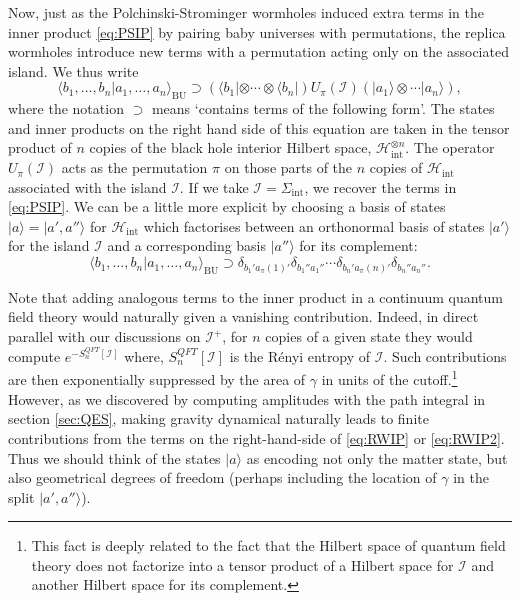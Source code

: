 \documentclass[letterpaper,12pt]{article}
\newcommand*{\hilb}{\mathcal{H}}	%
\newcommand*{\scri}{\mathscr{I}} %
\newcommand*{\island}{\mathcal{I}}
\begin{document}
Now, just as the Polchinski-Strominger wormholes induced extra terms in the inner product \eqref{eq:PSIP} by pairing baby universes with permutations, the replica wormholes introduce new terms with a permutation acting only on the associated island.  We thus write
\begin{equation}\label{eq:RWIP}
	\langle b_1,\ldots,b_n|a_1,\ldots,a_n \rangle_{\mathrm{BU}} \supset  (\langle b_1|\otimes \cdots \otimes \langle b_n|) U_\pi(\island) (|a_1\rangle\otimes \cdots |a_n \rangle),
\end{equation}
where the notation $\supset$ means `contains terms of the following form'.
The states and inner products on the right hand side of this equation are taken in the tensor product of $n$ copies of the black hole interior Hilbert space, $\hilb_\mathrm{int}^{\otimes n}$. The operator $U_\pi(\island)$ acts as the permutation $\pi$ on those parts of the $n$ copies of $\hilb_\mathrm{int}$ associated with the island $\island$. If we take $\island=\Sigma_\mathrm{int}$, we recover the terms in \eqref{eq:PSIP}. We can be a little more explicit by choosing a basis of states $|a\rangle = |a',a''\rangle$ for $\hilb_\mathrm{int}$ which factorises between an orthonormal basis of states $|a'\rangle$ for the island $\island$ and a corresponding basis  $|a''\rangle$ for its complement:
\begin{equation}\label{eq:RWIP2}
	\langle b_1,\ldots,b_n|a_1,\ldots,a_n \rangle_{\mathrm{BU}} \supset \delta_{b_1'a_\pi(1)'}\delta_{b_1''a_1''}\cdots  \delta_{b_n'a_\pi(n)'}\delta_{b_n''a_n''}.
\end{equation}

Note that adding analogous terms to the inner product in a continuum quantum field theory would naturally given a vanishing contribution.  Indeed, in direct parallel with our discussions on $\scri^+$, for $n$ copies of a given state they would compute $e^{-S_n^{QFT}[\island]}$ where,
$S_n^{QFT}[\island]$ is the R\'enyi entropy of $\island$.  Such contributions are then exponentially suppressed by the area of $\gamma$ in units of the cutoff.\footnote{This fact is deeply related to the fact that the Hilbert space of quantum field theory does not factorize into a tensor product of a Hilbert space for $\island$ and another Hilbert space for its complement.} However,
as we discovered by computing amplitudes with the path integral in section \ref{sec:QES}, making gravity dynamical naturally  leads to finite contributions from the terms on the right-hand-side of \eqref{eq:RWIP} or \eqref{eq:RWIP2}.
Thus we should think of the states $|a\rangle$ as encoding not only the matter state, but also geometrical degrees of freedom (perhaps including the location of $\gamma$ in the split $|a',a''\rangle$).
\end{document}
